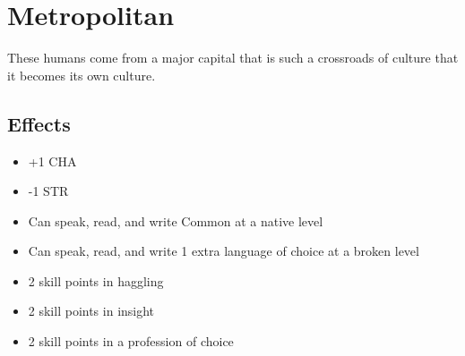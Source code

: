 \section{Metropolitan}\label{culture:metropolitan}
These humans come from a major capital that is such a crossroads of culture
that it becomes its own culture.

\subsection*{Effects}
\begin{itemize}
    \item +1 CHA
    \item -1 STR
    \item Can speak, read, and write Common at a native level
    \item Can speak, read, and write 1 extra language of choice at a broken
        level
    \item 2 skill points in haggling
    \item 2 skill points in insight
    \item 2 skill points in a profession of choice
\end{itemize}
